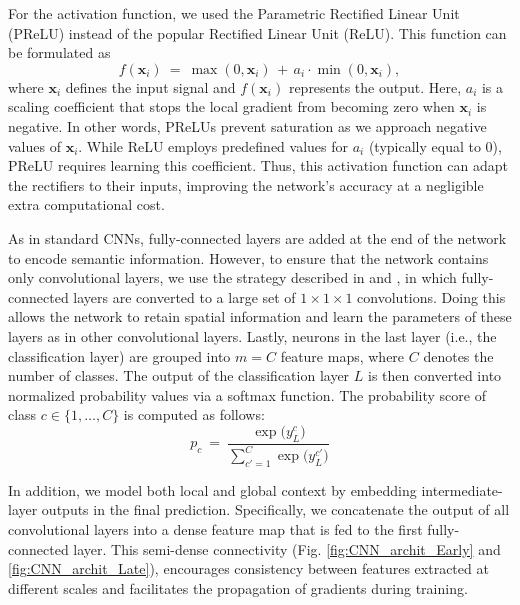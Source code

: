 \documentclass[twoside,espcrc2]{elsarticle}
\newcommand{\vold}[1]{$#1\!\times\!#1\!\times\!#1$}
\renewcommand{\vec}[1]{\mathbf{#1}}
\newcommand{\xx}{\vec x}
\begin{document}
For the activation function, we used the Parametric Rectified Linear Unit (PReLU) \cite{he2015delving} instead of the popular Rectified Linear Unit (ReLU). This function can be formulated as
\begin{equation}
    f(\xx_i) \ = \ \max(0, \xx_i) \, + \, a_i \! \cdot \! \min(0,\xx_i),
\end{equation}
where $\xx_i$ defines the input signal and $f(\xx_i)$ represents the output. Here, $a_i$ is a scaling coefficient that stops the local gradient from becoming zero when $\xx_i$ is negative. In other words, PReLUs prevent saturation as we approach negative values of $\xx_i$. While ReLU employs predefined values for $a_i$ (typically equal to 0), PReLU requires learning this coefficient. Thus, this activation function can adapt the rectifiers to their inputs, improving the network's accuracy at a negligible extra computational cost. 

As in standard CNNs, fully-connected layers are added at the end of the network to encode semantic information. However, to ensure that the network contains only convolutional layers, we use the strategy described in \cite{long2015fully} and \cite{kamnitsas2017efficient}, in which fully-connected layers are converted to a large set of \vold{1} convolutions. Doing this allows the network to retain spatial information and learn the parameters of these layers as in other convolutional layers. Lastly, neurons in the last layer (i.e., the classification layer) are grouped into $m=C$ feature maps, where $C$ denotes the number of classes. The output of the classification layer $L$ is then converted into normalized probability values via a softmax function. The probability score of class $c \in \{1, \ldots, C\}$ is computed as follows:
\begin{equation}
        p_c \ = \ \frac{\exp\big(y^c_L\big)}{\sum^{C}_{c'=1} \exp\big(y^{c'}_L\big)}
\label{eq:SoftMax}
\end{equation}
 
In addition, we model both local and global context by embedding intermediate-layer outputs in the final prediction. Specifically, we concatenate the output of all convolutional layers into a dense feature map that is fed to the first fully-connected layer. This semi-dense connectivity (Fig. \ref{fig:CNN_archit_Early} and \ref{fig:CNN_archit_Late}), encourages consistency between features extracted at different scales and facilitates the propagation of gradients during training. 
\end{document}
